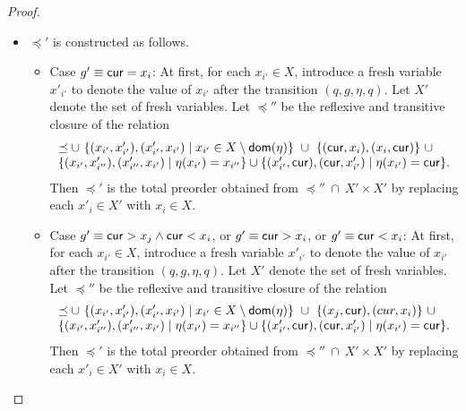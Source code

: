 \begin{appendix}
\begin{proof}
\begin{itemize}
%
%
%
%
\item $\preceq'$ is constructed as follows.
\begin{itemize}
\item Case $g' \equiv \mathsf{cur} = x_i$: At first, for each $x_{i'} \in X$, introduce a fresh variable $x'_{i'}$ to denote the value of $x_{i'}$ after the transition $(q, g, \eta,q)$. Let $X'$ denote the set of fresh variables. Let $\preceq''$ be the reflexive and transitive closure of the relation
\[
\begin{array}{l}
\preceq \cup\ \{(x_{i'}, x'_{i'}), (x'_{i'}, x_{i'}) \mid x_{i'} \in X \setminus \mathsf{dom}(\eta)\}\ \cup\ \{(\mathsf{cur}, x_i), (x_i, \mathsf{cur})\}\ \cup \\
 \{(x_{i'}, x'_{i''}), (x'_{i''}, x_{i'}) \mid \eta(x_{i'})=x_{i''}\} \cup \{(x'_{i'}, \mathsf{cur}), (\mathsf{cur}, x'_{i'}) \mid \eta(x_{i'}) = \mathsf{cur} \}.
\end{array}
\] 
Then $\preceq'$ is the total preorder obtained from $\preceq'' \ \cap\ X' \times X'$ by replacing each $x'_i \in X'$ with $x_i \in X$.

\item Case $g' \equiv \mathsf{cur} > x_j \wedge \mathsf{cur} < x_i$, or $g' \equiv  \mathsf{cur} > x_i$, or $g' \equiv \mathsf{cur} < x_i$:
At first, for each $x_{i'} \in X$, introduce a fresh variable $x'_{i'}$ to denote the value of $x_{i'}$ after the transition $(q, g, \eta,q)$. Let $X'$ denote the set of fresh variables. Let $\preceq''$ be the reflexive and transitive closure of the relation
\[
\begin{array}{l}
\preceq \cup\ \{(x_{i'}, x'_{i'}), (x'_{i'}, x_{i'}) \mid x_{i'} \in X \setminus \mathsf{dom}(\eta)\}\ \cup\ \{(x_j, \mathsf{cur}), (cur, x_i)\}\ \cup \\
\{(x_{i'}, x'_{i''}), (x'_{i''}, x_{i'}) \mid \eta(x_{i'})=x_{i''}\} \cup \{(x'_{i'}, \mathsf{cur}), (\mathsf{cur}, x'_{i'}) \mid \eta(x_{i'}) = \mathsf{cur} \}.
\end{array}
\] 
Then $\preceq'$ is the total preorder obtained from $\preceq'' \ \cap\ X' \times X'$ by replacing each $x'_i \in X'$ with $x_i \in X$.
\end{itemize}
%
%
\end{itemize}


\end{proof}
\end{appendix}
